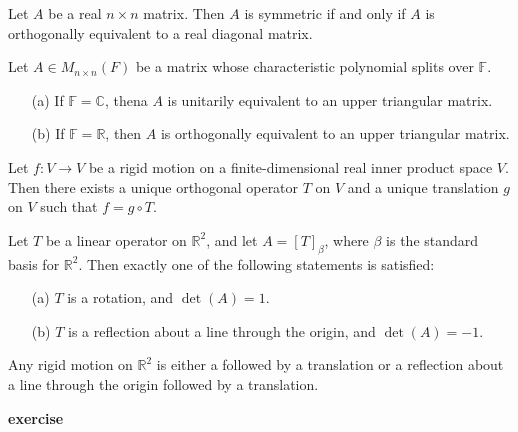 \vspace{3cm}
\begin{theorem}
    Let \(A\) be a real \(n \times n\) matrix. Then \(A\) is symmetric if and only if \(A\) is orthogonally equivalent to a real diagonal matrix.
\end{theorem}
\vspace{1cm}
\begin{theorem}
    Let \(A \in M_{n \times n}(F)\) be a matrix whose characteristic polynomial splits over \(\mathbb{F}\).
    \begin{enumerate}
        \item[(a)] If \(\mathbb{F} = \mathbb{C}\), thena \(A\) is unitarily equivalent to an upper triangular matrix.
        \item[(b)] If \(\mathbb{F} = \mathbb{R}\), then \(A\) is orthogonally equivalent to an upper triangular matrix. 
    \end{enumerate}
\end{theorem}
\newpage
\begin{theorem}
    Let \(f: V \to V\) be a rigid motion on a finite-dimensional real inner product space \(V\). Then there exists a unique orthogonal operator \(T\) on \(V\) and a unique translation \(g\) on \(V\) such that \(f = g \circ T\).
\end{theorem}
\newpage
\begin{theorem}
    Let \(T\) be a linear operator on \(\mathbb{R}^2\), and let \(A = [T]_{\beta}\), where \(\beta\) is the standard basis for \(\mathbb{R}^2\). Then exactly one of the following statements is satisfied:
    \begin{enumerate}
        \item[(a)] \(T\) is a rotation, and \(\det(A)=1.\)
        \item[(b)] \(T\) is a reflection about a line through the origin, and \(\det(A)=-1.\)
    \end{enumerate}
\end{theorem}
\vspace{7cm}
\begin{corollary}
    Any rigid motion on \(\mathbb{R}^2\) is either a followed by a translation or a reflection about a line through the origin followed by a translation.
\end{corollary}
\textbf{exercise}

